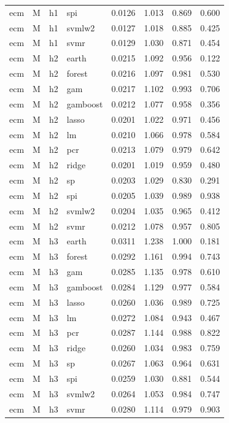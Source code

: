 \begin{ThreePartTable}
\begin{longtable}[t]{llclcccc}
ecm & M & h1 & spi & 0.0126 & 1.013 & 0.869 & 0.600\\
ecm & M & h1 & svmlw2 & 0.0127 & 1.018 & 0.885 & 0.425\\
ecm & M & h1 & svmr & 0.0129 & 1.030 & 0.871 & 0.454\\
\addlinespace
ecm & M & h2 & earth & 0.0215 & 1.092 & 0.956 & 0.122\\
ecm & M & h2 & forest & 0.0216 & 1.097 & 0.981 & 0.530\\
ecm & M & h2 & gam & 0.0217 & 1.102 & 0.993 & 0.706\\
ecm & M & h2 & gamboost & 0.0212 & 1.077 & 0.958 & 0.356\\
ecm & M & h2 & lasso & 0.0201 & 1.022 & 0.971 & 0.456\\
ecm & M & h2 & lm & 0.0210 & 1.066 & 0.978 & 0.584\\
ecm & M & h2 & pcr & 0.0213 & 1.079 & 0.979 & 0.642\\
ecm & M & h2 & ridge & 0.0201 & 1.019 & 0.959 & 0.480\\
ecm & M & h2 & sp & 0.0203 & 1.029 & 0.830 & 0.291\\
ecm & M & h2 & spi & 0.0205 & 1.039 & 0.989 & 0.938\\
ecm & M & h2 & svmlw2 & 0.0204 & 1.035 & 0.965 & 0.412\\
ecm & M & h2 & svmr & 0.0212 & 1.078 & 0.957 & 0.805\\
\addlinespace
ecm & M & h3 & earth & 0.0311 & 1.238 & 1.000 & 0.181\\
ecm & M & h3 & forest & 0.0292 & 1.161 & 0.994 & 0.743\\
ecm & M & h3 & gam & 0.0285 & 1.135 & 0.978 & 0.610\\
ecm & M & h3 & gamboost & 0.0284 & 1.129 & 0.977 & 0.584\\
ecm & M & h3 & lasso & 0.0260 & 1.036 & 0.989 & 0.725\\
ecm & M & h3 & lm & 0.0272 & 1.084 & 0.943 & 0.467\\
ecm & M & h3 & pcr & 0.0287 & 1.144 & 0.988 & 0.822\\
ecm & M & h3 & ridge & 0.0260 & 1.034 & 0.983 & 0.759\\
ecm & M & h3 & sp & 0.0267 & 1.063 & 0.964 & 0.631\\
ecm & M & h3 & spi & 0.0259 & 1.030 & 0.881 & 0.544\\
ecm & M & h3 & svmlw2 & 0.0264 & 1.053 & 0.984 & 0.747\\
ecm & M & h3 & svmr & 0.0280 & 1.114 & 0.979 & 0.903\\

\end{longtable}
\end{ThreePartTable}
